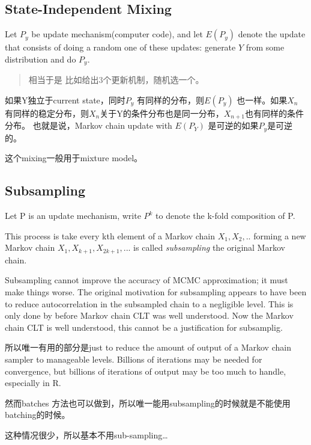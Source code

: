 \documentclass[
]{book}
\theoremstyle{definition}
\theoremstyle{definition}
\theoremstyle{definition}
\theoremstyle{remark}
\begin{document}
\hypertarget{state-independent-mixing}{%
\subsection{State-Independent Mixing}\label{state-independent-mixing}}

Let \(P_y\) be update mechanism(computer code), and let \(E(P_y)\) denote the update that consists of doing a random one of these updates: generate \(Y\) from some distribution and do \(P_y\).

\begin{quote}
相当于是 比如给出3个更新机制，随机选一个。
\end{quote}

如果Y独立于current state，同时\(P_y\) 有同样的分布，则\(E(P_y)\) 也一样。如果\(X_n\) 有同样的稳定分布，则\(X_n\)关于Y的条件分布也是同一分布，\(X_{n+1}\)也有同样的条件分布。
也就是说，Markov chain update with \(E(P_Y)\) 是可逆的如果\(P_y\)是可逆的。

这个mixing一般用于mixture model。

\hypertarget{subsampling}{%
\subsection{Subsampling}\label{subsampling}}

Let P is an update mechanism, write \(P^k\) to denote the k-fold composition of P.

This process is take every kth element of a Markov chain \(X_1,X_2,..\) forming a new Markov chain \(X_1,X_{k+1},X_{2k+1},...\) is called \emph{subsampling} the original Markov chain.

Subsampling cannot improve the accuracy of MCMC approximation; it must make things worse. The original motivation for subsampling appears to have been to reduce autocorrelation in the subsampled chain to a negligible level. This is only done by before Markov chain CLT was well understood. Now the Markov chain CLT is well understood, this cannot be a justification for subsamplig.

所以唯一有用的部分是just to reduce the amount of output of a Markov chain sampler to manageable levels. Billions of iterations may be needed for convergence, but billions of iterations of output may be too much to handle, especially in R.

然而batches 方法也可以做到，所以唯一能用subsampling的时候就是不能使用batching的时候。

这种情况很少，所以基本不用sub-sampling\ldots{}
\end{document}
